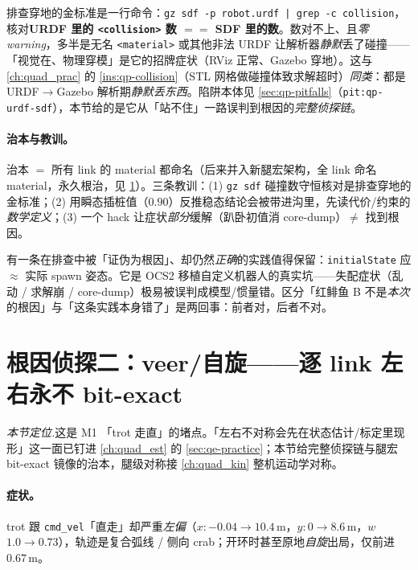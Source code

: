 \begin{insight}\label{ins:qadv-collision-conserve}
排查穿地的金标准是一行命令：\texttt{gz sdf -p robot.\allowbreak urdf | grep -c collision}，核对\textbf{URDF 里的 \texttt{<collision>} 数 $==$ SDF 里的数}。数对不上、且\emph{零 warning}，多半是无名 \texttt{<material>} 或其他非法 URDF 让解析器\emph{静默}丢了碰撞——「视觉在、物理穿模」是它的招牌症状（RViz 正常、Gazebo 穿地）。这与 \cref{ch:quad_prac} 的 \cref{ins:qp-collision}（STL 网格做碰撞体致求解超时）\emph{同类}：都是 URDF$\to$Gazebo 解析期\emph{静默丢东西}。陷阱本体见 \cref{sec:qp-pitfalls}（\texttt{pit:qp-urdf-sdf}），本节给的是它从「站不住」一路误判到根因的\emph{完整侦探链}。
\end{insight}

\paragraph{治本与教训。}
治本 $=$ 所有 link 的 material 都命名（后来并入新腿宏架构，全 link 命名 material，永久根治，见 \cref{sec:qadv-rc2}）。三条教训：(1) \texttt{gz sdf} 碰撞数守恒核对是排查穿地的金标准；(2) 用瞬态插桩值（$0.90$）反推稳态结论会被带进沟里，先读代价/约束的\emph{数学定义}；(3) 一个 hack 让症状\emph{部分}缓解（趴卧初值消 core-dump）$\neq$ 找到根因。

\begin{note}
有一条在排查中被「证伪为根因」、却仍然\emph{正确}的实践值得保留：\texttt{initialState} 应 $\approx$ 实际 spawn 姿态。它是 OCS2 移植自定义机器人的真实坑——失配症状（乱动 / 求解崩 / core-dump）极易被误判成模型/惯量错。区分「红鲱鱼 B 不是\emph{本次}的根因」与「这条实践本身错了」是两回事：前者对，后者不对。
\end{note}

\section{根因侦探二：veer/自旋——逐 link 左右永不 bit-exact}
\label{sec:qadv-rc2}

\noindent\emph{本节定位.}\;这是 M1 「trot 走直」的堵点。「左右不对称会先在状态估计/标定里现形」这一面已钉进 \cref{ch:quad_est} 的 \cref{sec:qe-practice}；本节给完整侦探链与腿宏 bit-exact 镜像的治本，腿级对称接 \cref{ch:quad_kin} 整机运动学对称。

\paragraph{症状。}
trot 跟 \texttt{cmd\_vel}「直走」却严重\emph{左偏}（$x{:}{-}0.04\to10.4$\,m，$y{:}0\to8.6$\,m，$w$ $1.0\to0.73$），轨迹是复合弧线 / 侧向 crab；开环时甚至原地\emph{自旋}出局，仅前进 $0.67$\,m。

